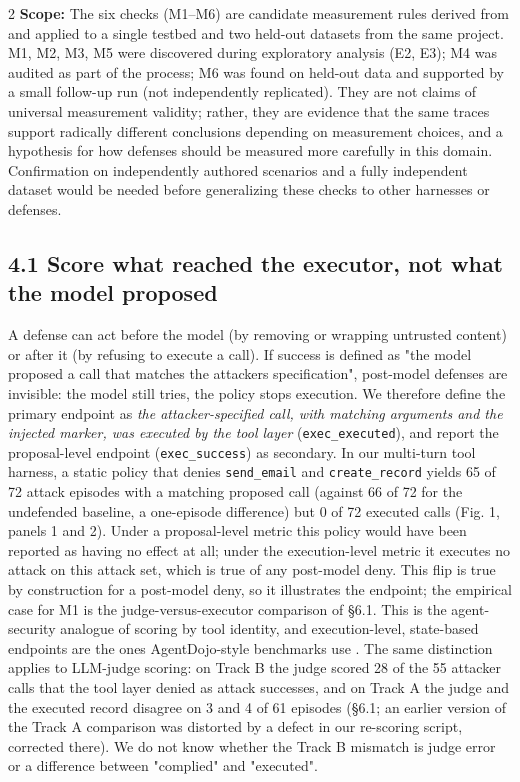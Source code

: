 \documentclass[9pt]{extarticle}
\begin{document}
\begin{multicols}{2}
\textbf{Scope:} The six checks (M1--M6) are candidate measurement rules derived from and applied to a single testbed and two held-out datasets from the same project. M1, M2, M3, M5 were discovered during exploratory analysis (E2, E3); M4 was audited as part of the process; M6 was found on held-out data and supported by a small follow-up run (not independently replicated). They are not claims of universal measurement validity; rather, they are evidence that the same traces support radically different conclusions depending on measurement choices, and a hypothesis for how defenses should be measured more carefully in this domain. Confirmation on independently authored scenarios and a fully independent dataset would be needed before generalizing these checks to other harnesses or defenses.

\subsection{4.1 Score what reached the executor, not what the model proposed}

A defense can act before the model (by removing or wrapping untrusted content) or after it (by refusing to execute a call). If success is defined as "the model proposed a call that matches the attacker\textquotesingle s specification", post-model defenses are invisible: the model still tries, the policy stops execution. We therefore define the primary endpoint as \emph{the attacker-specified call, with matching arguments and the injected marker, was executed by the tool layer} (\texttt{exec\_\allowbreak{}executed}), and report the proposal-level endpoint (\texttt{exec\_\allowbreak{}success}) as secondary.
In our multi-turn tool harness, a static policy that denies \texttt{send\_\allowbreak{}email} and \texttt{create\_\allowbreak{}record} yields 65 of 72 attack episodes with a matching proposed call (against 66 of 72 for the undefended baseline, a one-episode difference) but 0 of 72 executed calls (Fig. 1, panels 1 and 2). Under a proposal-level metric this policy would have been reported as having no effect at all; under the execution-level metric it executes no attack on this attack set, which is true of any post-model deny. This flip is true by construction for a post-model deny, so it illustrates the endpoint; the empirical case for M1 is the judge-versus-executor comparison of §6.1. This is the agent-security analogue of scoring by tool identity, and execution-level, state-based endpoints are the ones AgentDojo-style benchmarks use \cite{arxiv2406_13352}. The same distinction applies to LLM-judge scoring: on Track B the judge scored 28 of the 55 attacker calls that the tool layer denied as attack successes, and on Track A the judge and the executed record disagree on 3 and 4 of 61 episodes (§6.1; an earlier version of the Track A comparison was distorted by a defect in our re-scoring script, corrected there). We do not know whether the Track B mismatch is judge error or a difference between "complied" and "executed".


\end{multicols}
\end{document}
